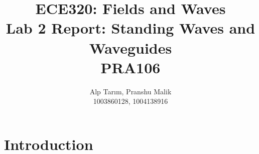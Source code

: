\documentclass[10pt]{article}
\date{}
\begin{document}
\title{\textbf{\Large{\textsc{ECE320:} Fields and Waves}} \\ \Large{Lab 2 Report: Standing Waves and Waveguides} \\ \textbf{\small{PRA106}}\vspace{-0.3cm}}
\author{Alp Tarım, Pranshu Malik \\ \footnotesize{1003860128}, \footnotesize{1004138916}}

\maketitle

\section{Introduction}
\end{document}
